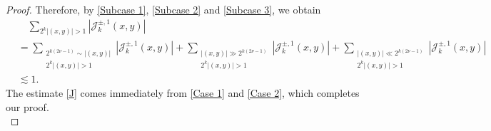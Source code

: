 \documentclass[10pt,a4paper]{amsart}
\begin{document}
\begin{proof}
Therefore, by \eqref{Subcase 1}, \eqref{Subcase 2} and \eqref{Subcase 3}, we obtain
\begin{equation}\label{Case 2}
\begin{aligned}
&\quad\sum_{2^k|(x,y)|>1}|\mathcal{J}_k^{\pm,1}(x,y)|\\
&=\sum_{\substack{2^{k(2\nu-1)}\sim |(x,y)|\\ 2^k|(x,y)|>1}}|\mathcal{J}_k^{\pm,1}(x,y)|+\sum_{\substack{|(x,y)|\gg 2^{k(2\nu-1)}\\ 2^k|(x,y)|>1}}|\mathcal{J}_k^{\pm,1}(x,y)|+\sum_{\substack{|(x,y)|\ll 2^{k(2\nu-1)}\\ 2^k|(x,y)|>1}}|\mathcal{J}_k^{\pm,1}(x,y)|\\
&\lesssim 1.
\end{aligned}
\end{equation}
The estimate \eqref{J} comes immediately from \eqref{Case 1} and \eqref{Case 2}, which completes our proof.\\
\end{proof}
\end{document}
